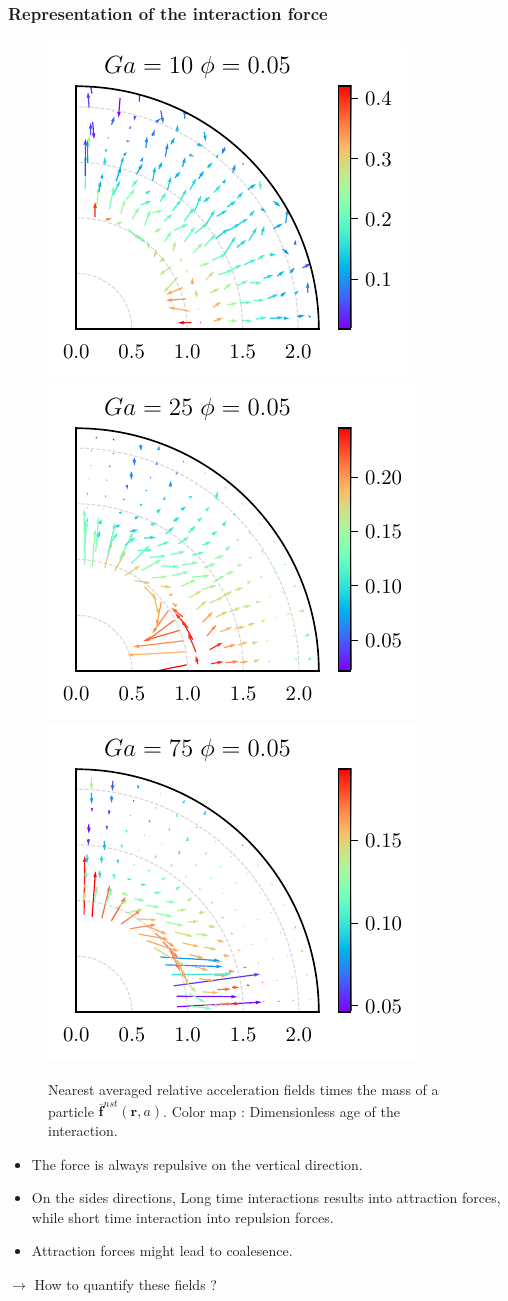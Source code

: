 \documentclass{sintefbeamer}
\newcommand{\nstavg}[1]{\overline{#1}^{nst}}
\newcommand{\nstrelavg}[1]{\overline{#1}_{nst}^{rel}}
\begin{document}
\begin{frame}
  \frametitle{Representation of the interaction force}

  \begin{figure}
    \includegraphics[height=0.25\textwidth]{image/HOMOGENEOUS/fDrop/F_mu_r_0_1_Ga_10_PHI_0_05.pdf}
    \includegraphics[height=0.25\textwidth]{image/HOMOGENEOUS/fDrop/F_mu_r_0_1_Ga_25_PHI_0_05.pdf}
    \includegraphics[height=0.25\textwidth]{image/HOMOGENEOUS/fDrop/F_mu_r_0_1_Ga_75_PHI_0_05.pdf}
    
    \caption{Nearest averaged relative acceleration fields times the mass of a particle $\nstavg{\textbf{f}}(\textbf{r},a)$. 
    Color map : Dimensionless age of the interaction.}
  \end{figure}

  
\begin{itemize}
  \item The force is always repulsive on the vertical direction.  
  \item On the sides  directions, Long time interactions results into attraction forces, while short time interaction into repulsion forces.
  \item Attraction forces might lead to coalesence. 
\end{itemize}

$\rightarrow$ How to quantify these fields ? 
\end{frame}
\end{document}
